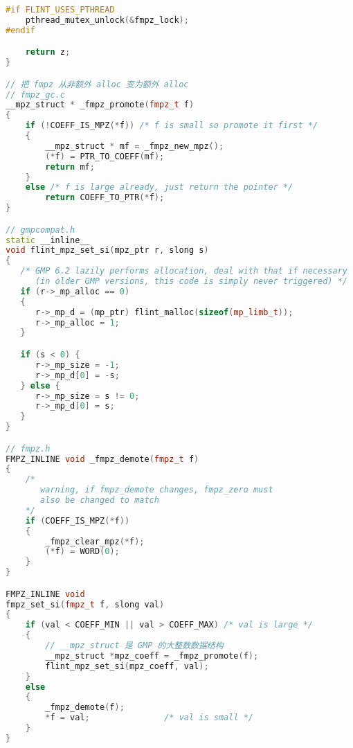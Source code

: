 \begin{lstlisting}[language=cpp]
#if FLINT_USES_PTHREAD
    pthread_mutex_unlock(&fmpz_lock);
#endif

    return z;
}

// 把 fmpz 从非额外 alloc 变为额外 alloc
// fmpz_gc.c
__mpz_struct * _fmpz_promote(fmpz_t f)
{
    if (!COEFF_IS_MPZ(*f)) /* f is small so promote it first */
    {
        __mpz_struct * mf = _fmpz_new_mpz();
        (*f) = PTR_TO_COEFF(mf);
        return mf;
    }
    else /* f is large already, just return the pointer */
        return COEFF_TO_PTR(*f);
}

// gmpcompat.h
static __inline__
void flint_mpz_set_si(mpz_ptr r, slong s)
{
   /* GMP 6.2 lazily performs allocation, deal with that if necessary
      (in older GMP versions, this code is simply never triggered) */
   if (r->_mp_alloc == 0)
   {
      r->_mp_d = (mp_ptr) flint_malloc(sizeof(mp_limb_t));
      r->_mp_alloc = 1;
   }

   if (s < 0) {
      r->_mp_size = -1;
      r->_mp_d[0] = -s;
   } else {
      r->_mp_size = s != 0;
      r->_mp_d[0] = s;
   }
}

// fmpz.h
FMPZ_INLINE void _fmpz_demote(fmpz_t f)
{
    /* 
       warning, if fmpz_demote changes, fmpz_zero must
       also be changed to match
    */
    if (COEFF_IS_MPZ(*f)) 
    {
        _fmpz_clear_mpz(*f);
        (*f) = WORD(0);
    }
}

FMPZ_INLINE void
fmpz_set_si(fmpz_t f, slong val)
{
    if (val < COEFF_MIN || val > COEFF_MAX) /* val is large */
    {
        // __mpz_struct 是 GMP 的大整数数据结构
        __mpz_struct *mpz_coeff = _fmpz_promote(f);
        flint_mpz_set_si(mpz_coeff, val);
    }
    else
    {
        _fmpz_demote(f);
        *f = val;               /* val is small */
    }
}
\end{lstlisting}
